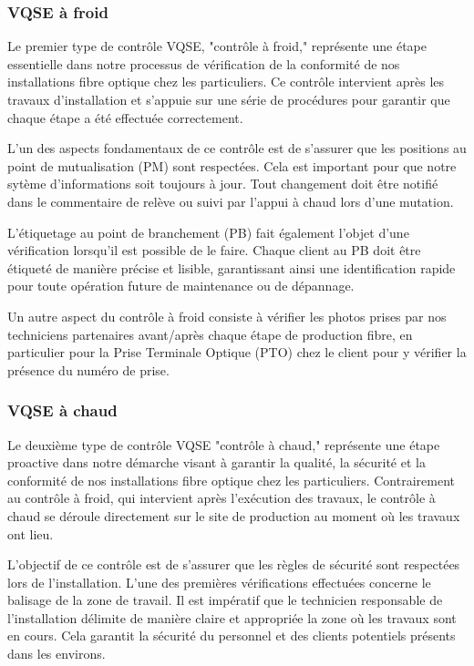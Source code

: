 \documentclass[12pt, a4paper]{article}
\begin{document}
\subsubsection{VQSE à froid}
Le premier type de contrôle VQSE,  "contrôle à froid,"
représente une étape essentielle dans notre
processus de vérification de la conformité de
nos installations fibre optique chez
les particuliers. Ce contrôle intervient
après les travaux d'installation et
s'appuie sur une série de procédures pour
garantir que chaque étape a été effectuée correctement.

L'un des aspects fondamentaux de ce
contrôle est de s'assurer que les positions
au point de mutualisation (PM) sont
respectées. Cela est important pour que notre sytème 
d'informations soit toujours à jour. Tout changement
doit être notifié dans le commentaire de relève 
ou suivi par l'appui à chaud lors d'une mutation.

L'étiquetage au point de branchement (PB) fait
également l'objet d'une vérification lorsqu'il
est possible de le faire. Chaque client au PB doit
être étiqueté de manière précise et lisible,
garantissant ainsi une identification rapide
pour toute opération future de
maintenance ou de dépannage.

Un autre aspect du contrôle à froid
consiste à vérifier les photos prises
par nos techniciens partenaires avant/après
chaque étape de production fibre, en
particulier pour la Prise Terminale
Optique (PTO) chez le client pour y vérifier
la présence du numéro de prise.  


\subsubsection{VQSE à chaud}
Le deuxième type de contrôle VQSE "contrôle à chaud,"
représente une étape proactive
dans notre démarche visant à garantir la qualité,
la sécurité et la conformité de nos installations
fibre optique chez les particuliers.
Contrairement au contrôle à froid, qui
intervient après l'exécution des travaux,
le contrôle à chaud se déroule directement
sur le site de production au moment où les
travaux ont lieu.

L'objectif de ce contrôle est
de s'assurer que les règles de sécurité
sont respectées lors de l'installation.
L'une des premières vérifications effectuées
concerne le balisage de la zone de travail.
Il est impératif que le technicien
responsable de l'installation délimite
de manière claire et appropriée la zone
où les travaux sont en cours. Cela garantit
la sécurité du personnel et des clients
potentiels présents dans les environs.
\newpage
\end{document}
